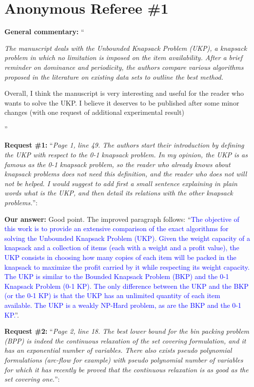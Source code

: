 \documentclass{elsarticle}
\begin{document}
\section{Anonymous Referee \#1}

\textbf{General commentary:} ``{\itshape
The manuscript deals with the Unbounded Knapsack Problem (UKP), a knapsack problem in which no limitation is imposed on the item availability. After a brief reminder on dominance and periodicity, the authors compare various algorithms proposed in the literature on existing data sets to outline the best method.

Overall, I think the manuscript is very interesting and useful for the reader who wants to solve the UKP. I believe it deserves to be published after some minor changes (with one request of additional experimental result)
}''

\textbf{Request \#1:} ``\textit{Page 1, line 49. The authors start their introduction by defining the UKP with respect to the 0-1 knapsack problem. In my opinion, the UKP is as famous as the 0-1 knapsack problem, so the reader who already knows about knapsack problems does not need this definition, and the reader who does not will not be helped. I would suggest to add first a small sentence explaining in plain words what is the UKP, and then detail its relations with the other knapsack problems.}'':

\textbf{Our answer:} Good point. The improved paragraph follows: ``\textcolor{blue}{The objective of this work is to provide an extensive comparison of the exact algorithms for solving the Unbounded Knapsack Problem (UKP). Given the weight capacity of a knapsack and a collection of items (each with a weight and a profit value), the UKP consists in choosing how many copies of each item will be packed in the knapsack to maximize the profit carried by it while respecting its weight capacity. The UKP is similar to the Bounded Knapsack Problem (BKP) and the 0-1 Knapsack Problem (0-1 KP). The only difference between the UKP and the BKP (or the 0-1 KP) is that the UKP has an unlimited quantity of each item available. The UKP is a weakly NP-Hard problem, as are the BKP and the 0-1 KP.}''.
\medskip

\textbf{Request \#2:} ``\textit{Page 2, line 18. The best lower bound for the bin packing problem (BPP) is indeed the continuous relaxation of the set covering formulation, and it has an exponential number of variables. There also exists pseudo polynomial formulations (arc-flow for example) with pseudo polynomial number of variables for which it has recently be proved that the continuous relaxation is as good as the set covering one.}'':
\end{document}
